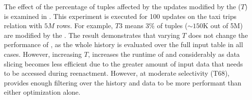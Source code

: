 \label{sec:exp-ds}
The effect of the percentage of  tuples affected by the updates modified by the \abbrHW ($T$) is examined in . This experiment is executed for 100 updates on the taxi trips relation with $5M$ rows. For example, $T3$ means 3\% of tuples ($\sim150$K out of 5M) are modified by the \abbrHW. The result demonstrates that varying $T$ does not change the performance of \mrp, as the whole history is evaluated over the full input table in all cases. However, increasing $T$, increases the runtime of \mrd and \mrdp considerably as data slicing becomes less efficient due to the greater amount of input data that needs to be accessed during reenactment. However, at moderate selectivity (T68), \mrdp provides enough filtering over the history and data to be more performant than either optimization alone. %
%


